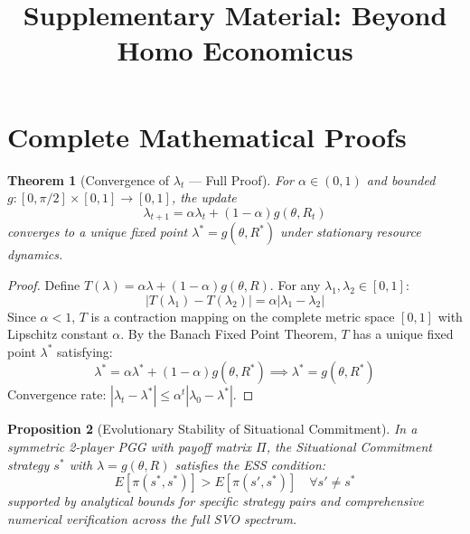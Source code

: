 \documentclass{article}
\title{Supplementary Material: Beyond Homo Economicus}
\author{}
\newtheorem{theorem}{Theorem}
\newtheorem{proposition}[theorem]{Proposition}
\begin{document}
\maketitle

\appendix

\section{Complete Mathematical Proofs}
\label{app:proofs}

\begin{theorem}[Convergence of $\lambda_t$ --- Full Proof]
For $\alpha \in (0,1)$ and bounded $g: [0, \pi/2] \times [0,1] \to [0,1]$, the update
\[
\lambda_{t+1} = \alpha \lambda_t + (1-\alpha) g(\theta, R_t)
\]
converges to a unique fixed point $\lambda^* = g(\theta, R^*)$ under stationary resource dynamics.
\end{theorem}

\begin{proof}
Define $T(\lambda) = \alpha \lambda + (1-\alpha) g(\theta, R)$. For any $\lambda_1, \lambda_2 \in [0,1]$:
\[
|T(\lambda_1) - T(\lambda_2)| = \alpha |\lambda_1 - \lambda_2|
\]
Since $\alpha < 1$, $T$ is a contraction mapping on the complete metric space $[0,1]$ with Lipschitz constant $\alpha$. By the Banach Fixed Point Theorem, $T$ has a unique fixed point $\lambda^*$ satisfying:
\[
\lambda^* = \alpha \lambda^* + (1-\alpha) g(\theta, R^*) \implies \lambda^* = g(\theta, R^*)
\]
Convergence rate: $|\lambda_t - \lambda^*| \leq \alpha^t |\lambda_0 - \lambda^*|$.
\end{proof}

\begin{proposition}[Evolutionary Stability of Situational Commitment]
In a symmetric 2-player PGG with payoff matrix $\Pi$, the Situational Commitment strategy $s^*$ with $\lambda = g(\theta, R)$ satisfies the ESS condition:
\[
E[\pi(s^*, s^*)] > E[\pi(s', s^*)] \quad \forall s' \neq s^*
\]
supported by analytical bounds for specific strategy pairs and comprehensive numerical verification across the full SVO spectrum.
\end{proposition}
\end{document}
